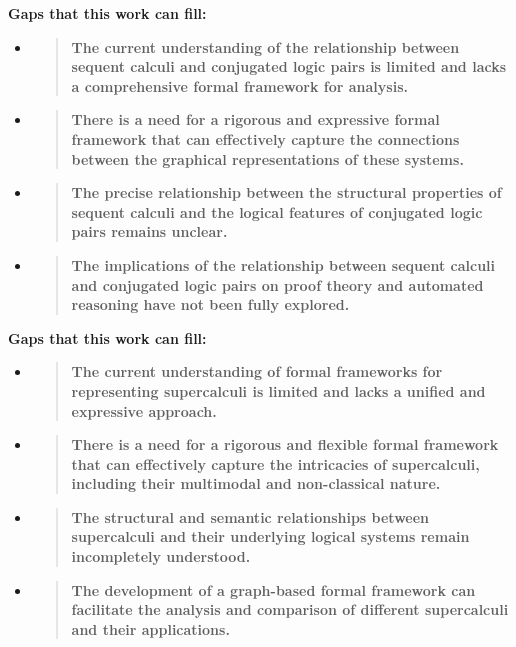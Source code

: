 \textbf{Gaps that this work can fill:}

\begin{itemize}
\item
  \begin{quote}
  \textbf{The current understanding of the relationship between sequent
  calculi and conjugated logic pairs is limited and lacks a
  comprehensive formal framework for analysis.\\
  }
  \end{quote}
\item
  \begin{quote}
  \textbf{There is a need for a rigorous and expressive formal framework
  that can effectively capture the connections between the graphical
  representations of these systems.\\
  }
  \end{quote}
\item
  \begin{quote}
  \textbf{The precise relationship between the structural properties of
  sequent calculi and the logical features of conjugated logic pairs
  remains unclear.\\
  }
  \end{quote}
\item
  \begin{quote}
  \textbf{The implications of the relationship between sequent calculi
  and conjugated logic pairs on proof theory and automated reasoning
  have not been fully explored.}
  \end{quote}
\end{itemize}

\textbf{Gaps that this work can fill:}

\begin{itemize}
\item
  \begin{quote}
  \textbf{The current understanding of formal frameworks for
  representing supercalculi is limited and lacks a unified and
  expressive approach.}
  \end{quote}
\item
  \begin{quote}
  \textbf{There is a need for a rigorous and flexible formal framework
  that can effectively capture the intricacies of supercalculi,
  including their multimodal and non-classical nature.}
  \end{quote}
\item
  \begin{quote}
  \textbf{The structural and semantic relationships between supercalculi
  and their underlying logical systems remain incompletely understood.}
  \end{quote}
\item
  \begin{quote}
  \textbf{The development of a graph-based formal framework can
  facilitate the analysis and comparison of different supercalculi and
  their applications.}
  \end{quote}
\end{itemize}

